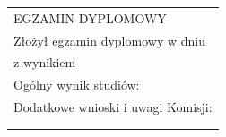 \begin{center}
 \begin{tabular}{m{\textwidth}}
EGZAMIN DYPLOMOWY \\ \addlinespace[6pt]
Złożył egzamin dyplomowy w dniu\dotfill \\ \addlinespace[6pt]
z wynikiem\dotfill \\ \addlinespace[6pt]
Ogólny wynik studiów:\dotfill \\ \addlinespace[6pt]
Dodatkowe wnioski i uwagi Komisji:\dotfill \\ \addlinespace[6pt]
\dotfill \\ \addlinespace[6pt]
\dotfill
 \end{tabular}
\end{center}
